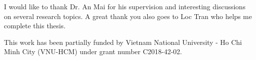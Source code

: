 
\begin{acknowledgements}      

I would like to thank Dr. An Mai for his supervision and interesting discussions on several research topics. A great thank you also goes to Loc Tran who helps me complete this thesis.

This work has been partially funded by Vietnam National University - Ho Chi Minh City (VNU-HCM) under grant number C2018-42-02.

\end{acknowledgements}
